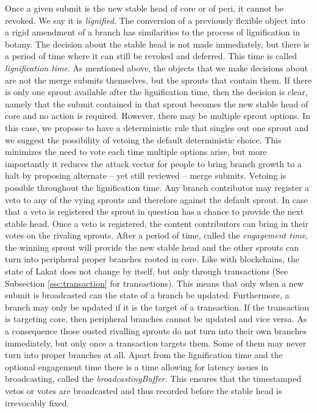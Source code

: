 Once a given submit is the new stable head of core or of peri, it cannot be revoked. We say it is \textit{lignified}. The conversion of a previously flexible object into a rigid amendment of a branch has similarities to the process of lignification in botany. 
The decision about the stable head is not made immediately, but there is a period of time where it can still be revoked and deferred. This time is called \textit{lignification time}. As mentioned above, the objects that we make decisions about are not the merge submits themselves, but the sprouts that contain them. If there is only one sprout available after the lignification time, then the decision is clear, namely that the submit contained in that sprout becomes the new stable head of core and no action is required. However, there may be multiple sprout options. In this case, we propose to have a deterministic rule that singles out one sprout and we suggest the possibility of vetoing the default deterministic choice. This minimizes the need to vote each time multiple options arise, but more importantly it reduces the attack vector for people to bring branch growth to a halt by proposing alternate -- yet still reviewed -- merge submits. Vetoing is possible throughout the lignification time. Any branch contributor may register a veto to any of the vying sprouts and therefore against the default sprout. In case that a veto is registered the sprout in question has a chance to provide the next stable head. 
Once a veto is registered, the content contributors can bring in their votes on the rivaling sprouts. After a period of time, called the \textit{engagement time}, the winning sprout will provide the new stable head and the other sprouts can turn into peripheral proper branches rooted in core. Like with blockchains, the state of Lakat does not change by itself, but only through transactions (See Subsection \ref{ssc:transaction} for transactions). This means that only when a new submit is broadcasted can the state of a branch be updated. Furthermore, a branch may only be updated if it is the target of a transaction. If the transaction is targeting core, then peripheral branches cannot be updated and vice versa. As a consequence those ousted rivalling sprouts do not turn into their own branches immediately, but only once a transaction targets them. Some of them may never turn into proper branches at all. Apart from the lignification time and the optional engagement time there is a time allowing for latency issues in broadcasting, called the \textit{broadcastingBuffer}. This ensures that the timestamped vetos or votes are broadcasted and thus recorded before the stable head is irrevocably fixed.

